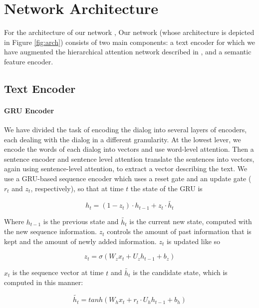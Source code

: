 \section{Network Architecture}\label{sec:network}
For the architecture of our network , 
Our network (whose architecture is depicted in Figure \ref{fig:arch}) consists of two main components: 
a text encoder for which we have augmented the hierarchical attention network described in \cite{attention}, 
and a semantic feature encoder. 

\subsection{Text Encoder}

\paragraph*{GRU Encoder}
We have divided the task of encoding the dialog into several 
layers of encoders, each dealing with the dialog in a different granularity. 
At the lowest lever, we encode the words of each dialog into vectors 
and use word-level attention. Then a sentence encoder and sentence level attention 
translate the sentences into vectors, again using sentence-level attention, to extract a vector describing the text. 
We use a GRU-based sequence encoder \cite{BahdanauCB14} which uses 
a reset gate and an update gate ($r_t$ and $z_t$, respectively), 
so that at time $t$ the state of the GRU is 

\begin{equation*}
	h_t = (1-z_t)\cdot h_{t-1} + z_t \cdot \widetilde{h_t}
\end{equation*}

Where $h_{t-1}$ is the previous state and $\widetilde{h_t}$ 
is the current new state, computed with the new sequence information. 
$z_t$ controls the amount of past information that is kept 
and the amount of newly added information. $z_t$ is updated like so

\begin{equation*}
	z_t = \sigma(W_z x_t + U_z h_{t-1} + b_z)
\end{equation*}

$x_t$ is the sequence vector at time $t$ and 
$\widetilde{h_t}$ is the candidate state, which is 
computed in this manner: 

\begin{equation*}
	\widetilde{h_t} = tanh(W_h x_t + r_t \cdot U_h h_{t-1} + b_h)
\end{equation*}

